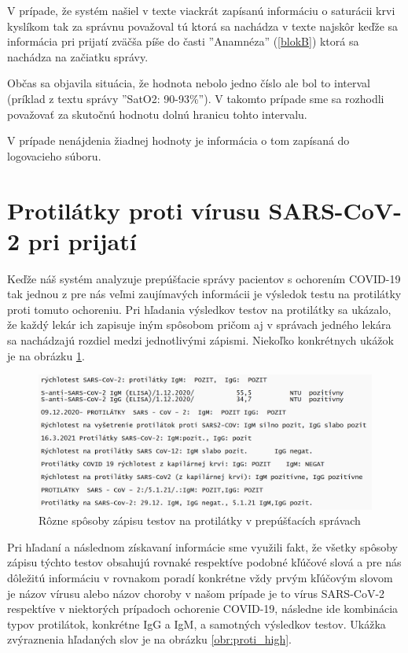 V prípade, že systém našiel v texte viackrát zapísanú informáciu o saturácii krvi kyslíkom tak za správnu považoval tú ktorá sa nachádza v texte najskôr keďže sa informácia pri prijatí zväčša píše do časti ''Anamnéza'' (\ref{blokB}) ktorá sa nachádza na začiatku správy.

Občas sa objavila situácia, že hodnota nebolo jedno číslo ale bol to interval (príklad z textu správy ''SatO2: 90-93\%''). V takomto prípade sme sa rozhodli považovať za skutočnú hodnotu dolnú hranicu tohto intervalu.

V prípade nenájdenia žiadnej hodnoty je informácia o tom zapísaná do logovacieho súboru. 

\section{Protilátky proti vírusu SARS-CoV-2 pri prijatí}
\label{protilatky}

Keďže náš systém analyzuje prepúšťacie správy pacientov s ochorením COVID-19 tak jednou z pre nás veľmi zaujímavých informácii je výsledok testu na protilátky proti tomuto ochoreniu. Pri hľadania výsledkov testov na protilátky sa ukázalo, že každý lekár ich zapisuje iným spôsobom pričom aj v správach jedného lekára sa nachádzajú rozdiel medzi jednotlivými zápismi. Niekoľko konkrétnych ukážok je na obrázku \ref{obr:proti}. 

\begin{figure}
	\centerline{\includegraphics[width=1\textwidth]{images/protilatky}}
	\caption[Protilátky]{Rôzne spôsoby zápisu testov na protilátky v prepúšťacích správach}
	\label{obr:proti}
\end{figure}

Pri hľadaní a následnom získavaní informácie sme využili fakt, že všetky spôsoby zápisu týchto testov obsahujú rovnaké respektíve podobné kľúčové slová a pre nás dôležitú informáciu v rovnakom poradí konkrétne vždy prvým kľúčovým slovom je názov vírusu alebo názov choroby v našom prípade je to vírus SARS-CoV-2 respektíve v niektorých prípadoch ochorenie COVID-19, následne ide kombinácia typov protilátok, konkrétne IgG a IgM, a samotných výsledkov testov. Ukážka zvýraznenia hľadaných slov je na obrázku \ref{obr:proti_high}.

